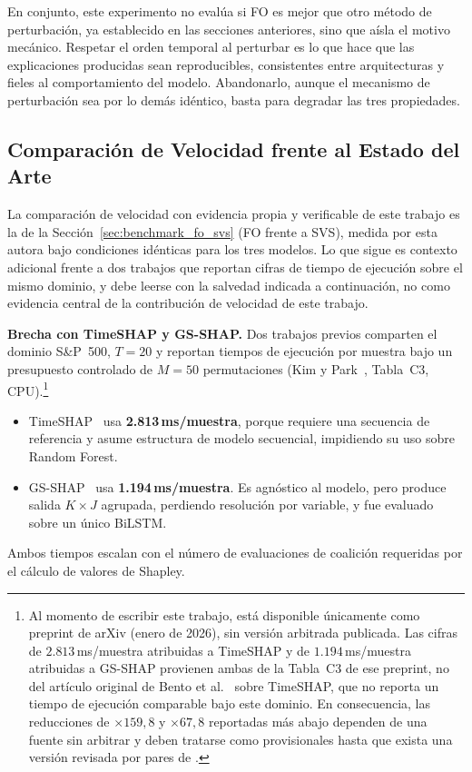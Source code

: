 \documentclass[conference, letterpaper]{IEEEtran}
\begin{document}
En conjunto, este experimento no evalúa si FO es mejor que otro
método de perturbación, ya establecido en las secciones anteriores,
sino que aísla el motivo mecánico. Respetar el orden temporal al
perturbar es lo que hace que las explicaciones producidas sean
reproducibles, consistentes entre arquitecturas y fieles al
comportamiento del modelo. Abandonarlo, aunque el mecanismo de
perturbación sea por lo demás idéntico, basta para degradar las tres
propiedades.

\subsection{Comparación de Velocidad frente al Estado del Arte}
\label{sec:avance2}

La comparación de velocidad con evidencia propia y verificable de
este trabajo es la de la Sección~\ref{sec:benchmark_fo_svs} (FO
frente a SVS), medida por esta autora bajo condiciones idénticas
para los tres modelos. Lo que sigue es contexto adicional frente a
dos trabajos que reportan cifras de tiempo de ejecución sobre el
mismo dominio, y debe leerse con la salvedad indicada a
continuación, no como evidencia central de la contribución de
velocidad de este trabajo.

\textbf{Brecha con TimeSHAP y GS-SHAP.}
Dos trabajos previos comparten el dominio S\&P~500, $T{=}20$ y
reportan tiempos de ejecución por muestra bajo un presupuesto
controlado de $M{=}50$ permutaciones (Kim y
Park~\cite{gsshap2026}, Tabla~C3, CPU).\footnote{Al momento de
escribir este trabajo, \cite{gsshap2026} está disponible
únicamente como preprint de arXiv (enero de 2026), sin versión
arbitrada publicada. Las cifras de $2{.}813$\,ms/muestra atribuidas
a TimeSHAP y de $1{.}194$\,ms/muestra atribuidas a GS-SHAP provienen
ambas de la Tabla~C3 de ese preprint, no del artículo original de
Bento et al.~\cite{bento2021} sobre TimeSHAP, que no reporta un
tiempo de ejecución comparable bajo este dominio. En consecuencia,
las reducciones de ${\times}159{,}8$ y ${\times}67{,}8$ reportadas
más abajo dependen de una fuente sin arbitrar y deben tratarse como
provisionales hasta que exista una versión revisada por pares de
\cite{gsshap2026}.}
\begin{itemize}
  \item TimeSHAP~\cite{bento2021} usa \textbf{2.813\,ms/muestra},
    porque requiere una secuencia de referencia y asume estructura de modelo
    secuencial, impidiendo su uso sobre Random Forest.
  \item GS-SHAP~\cite{gsshap2026} usa \textbf{1.194\,ms/muestra}.
    Es agnóstico al modelo, pero produce salida $K{\times}J$ agrupada,
    perdiendo resolución por variable, y fue evaluado sobre un único
    BiLSTM.
\end{itemize}
Ambos tiempos escalan con el número de evaluaciones de coalición
requeridas por el cálculo de valores de Shapley.
\end{document}

